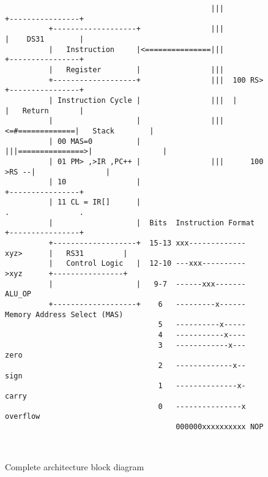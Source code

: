 \begin{figure*}[h!]
\begin{lstlisting}
                                               |||                +----------------+
          +-------------------+                |||                |    DS31        |
          |   Instruction     |<===============|||                +----------------+
          |   Register        |                |||
          +-------------------+                |||  100 RS>       +----------------+
          | Instruction Cycle |                |||  |             |   Return       |
          |                   |                |||<=#=============|   Stack        |
          | 00 MAS=0          |                |||===============>|                |
          | 01 PM> ,>IR ,PC++ |                |||      100 >RS --|                |
          | 10                |                                   +----------------+
          | 11 CL = IR[]      |                                   .                .
          |                   |  Bits  Instruction Format         +----------------+
          +-------------------+  15-13 xxx------------- xyz>      |   RS31         |
          |   Control Logic   |  12-10 ---xxx---------- >xyz      +----------------+
          |                   |   9-7  ------xxx------- ALU_OP      
          +-------------------+    6   ---------x------ Memory Address Select (MAS)
                                   5   ----------x----- 
                                   4   -----------x---- 
                                   3   ------------x--- zero
                                   2   -------------x-- sign
                                   1   --------------x- carry
                                   0   ---------------x overflow
                                       000000xxxxxxxxxx NOP
                                 
                                                
\end{lstlisting}
\caption[Architecture Block Diagram]{Complete architecture block diagram}
\end{figure*}

